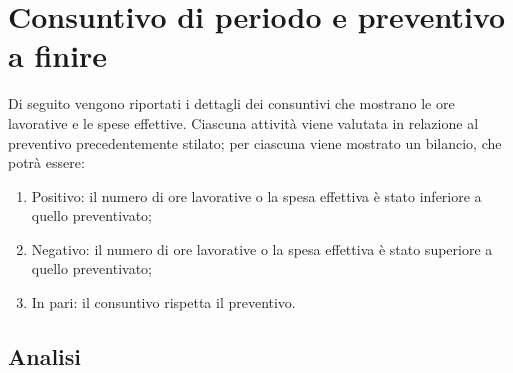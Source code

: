 \clearpage
\section{Consuntivo di periodo e preventivo a finire}
\label{sec:consuntivo}
Di seguito vengono riportati i dettagli dei consuntivi che mostrano le ore lavorative e le spese effettive.
Ciascuna attività viene valutata in relazione al preventivo precedentemente stilato; per ciascuna viene mostrato un bilancio, che potrà essere:
\begin{enumerate}
	\item Positivo: il numero di ore lavorative o la spesa effettiva è stato inferiore a quello preventivato;
	\item Negativo: il numero di ore lavorative o la spesa effettiva è stato superiore a quello preventivato;
	\item In pari: il consuntivo rispetta il preventivo.
\end{enumerate}
\subsection{Analisi}
\label{sec:analisi}
